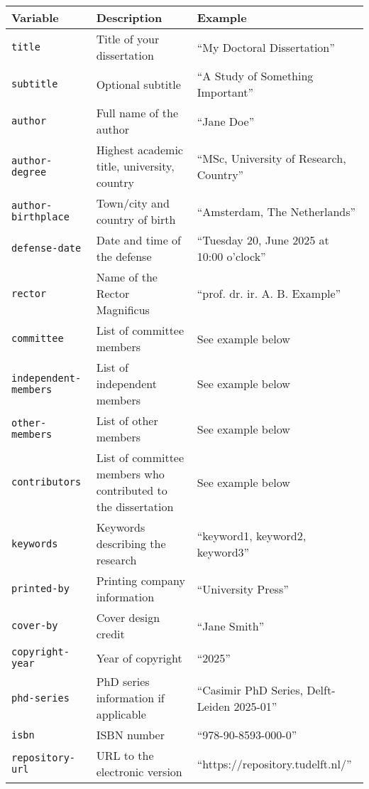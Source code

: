 \documentclass{tudelft}
\begin{document}
\begin{longtable}[]{@{}
  >{\raggedright\arraybackslash}p{}
  >{\raggedright\arraybackslash}p{}
  >{\raggedright\arraybackslash}p{}@{}}
\toprule\noalign{}
\begin{minipage}[b]{\linewidth}\raggedright
Variable
\end{minipage} & \begin{minipage}[b]{\linewidth}\raggedright
Description
\end{minipage} & \begin{minipage}[b]{\linewidth}\raggedright
Example
\end{minipage} \\
\midrule\noalign{}
\endhead
\bottomrule\noalign{}
\endlastfoot
\texttt{title} & Title of your dissertation & ``My Doctoral
Dissertation'' \\
\texttt{subtitle} & Optional subtitle & ``A Study of Something
Important'' \\
\texttt{author} & Full name of the author & ``Jane Doe'' \\
\texttt{author-degree} & Highest academic title, university, country &
``MSc, University of Research, Country'' \\
\texttt{author-birthplace} & Town/city and country of birth &
``Amsterdam, The Netherlands'' \\
\texttt{defense-date} & Date and time of the defense & ``Tuesday 20,
June 2025 at 10:00 o'clock'' \\
\texttt{rector} & Name of the Rector Magnificus & ``prof. dr. ir. A. B.
Example'' \\
\texttt{committee} & List of committee members & See example below \\
\texttt{independent-members} & List of independent members & See example
below \\
\texttt{other-members} & List of other members & See example below \\
\texttt{contributors} & List of committee members who contributed to the
dissertation & See example below \\
\texttt{keywords} & Keywords describing the research & ``keyword1,
keyword2, keyword3'' \\
\texttt{printed-by} & Printing company information & ``University
Press'' \\
\texttt{cover-by} & Cover design credit & ``Jane Smith'' \\
\texttt{copyright-year} & Year of copyright & ``2025'' \\
\texttt{phd-series} & PhD series information if applicable & ``Casimir
PhD Series, Delft-Leiden 2025-01'' \\
\texttt{isbn} & ISBN number & ``978-90-8593-000-0'' \\
\texttt{repository-url} & URL to the electronic version &
``https://repository.tudelft.nl/'' \\
\end{longtable}
\end{document}
